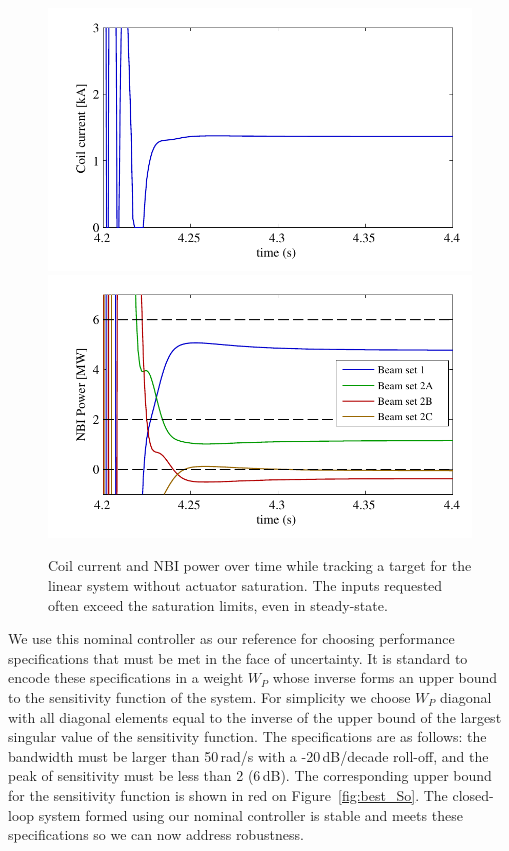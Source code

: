 \documentclass[12pt,lot, lof]{puthesis}
\begin{document}
\begin{figure}[htbp]
	\centering
	\includegraphics{chap10/fast_u_current}
	\includegraphics{chap10/fast_u_beams}
	\caption{Coil current and NBI power over time while tracking a target for the linear system without actuator saturation.
		The inputs requested often exceed the saturation limits, even in steady-state.
	}
	\label{fig:best_u}
\end{figure}

We use this nominal controller as our reference for choosing performance specifications that must be met in the face of uncertainty.
It is standard to encode these specifications in a weight $W_P$ whose inverse forms an upper bound to the sensitivity function of the system.
For simplicity we choose $W_P$ diagonal with all diagonal elements equal to the inverse of the upper bound of the largest singular value of the sensitivity function.
The specifications are as follows: the bandwidth must be larger than 50\,rad/s with a -20\,dB/decade roll-off, and the peak of sensitivity must be less than 2 (6\,dB).
The corresponding upper bound for the sensitivity function is shown in red on Figure~\ref{fig:best_So}.
The closed-loop system formed using our nominal controller is stable and meets these specifications so we can now address robustness.
\end{document}
